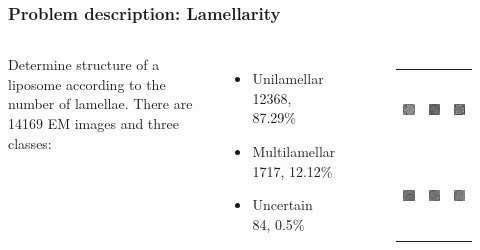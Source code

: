 \documentclass{beamer}
\begin{document}
%
%

\begin{frame}
\frametitle{Problem description: Lamellarity}

\begin{columns}
Determine structure of a liposome according to the number of lamellae.
\vskip 0.2in
There are 14169 EM images and three classes:
\begin{itemize}
\item Unilamellar \\ 12368, 87.29\%
\item Multilamellar \\ 1717, 12.12\%
\item Uncertain \\ 84, 0.5\%
\end{itemize}
\begin{figure}[H]
\centering
\begin{tabular}{ccc}
	\includegraphics[height=2cm, keepaspectratio]{problem_description/lamellarity/uni} & \includegraphics[height=2cm, keepaspectratio]{problem_description/lamellarity/multi} & \includegraphics[height=2cm, keepaspectratio]{problem_description/lamellarity/uncertain} \\
	\includegraphics[height=2cm, keepaspectratio]{problem_description/lamellarity/uni2} & \includegraphics[height=2cm, keepaspectratio]{problem_description/lamellarity/multi2} & \includegraphics[height=2cm, keepaspectratio]{problem_description/lamellarity/uncertain2} \\

\end{tabular}
\end{figure}
\end{columns}
\end{frame}
\end{document}
